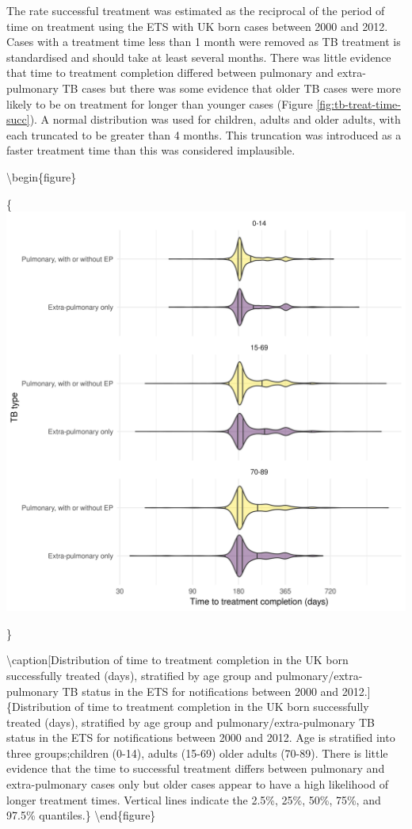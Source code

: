 \documentclass[11pt,twoside]{bristolthesis}
\begin{document}
  The rate successful treatment was estimated as the reciprocal of the period of time on treatment using the ETS with UK born cases between 2000 and 2012. Cases with a treatment time less than 1 month were removed as TB treatment is standardised and should take at least several months. There was little evidence that time to treatment completion differed between pulmonary and extra-pulmonary TB cases but there was some evidence that older TB cases were more likely to be on treatment for longer than younger cases (Figure \ref{fig:tb-treat-time-succ}). A normal distribution was used for children, adults and older adults, with each truncated to be greater than 4 months. This truncation was introduced as a faster treatment time than this was considered implausible.
  
  \textbackslash{}begin\{figure\}
  
  \{\centering \includegraphics[width=0.8\linewidth,]{chapters/model-development/resources/figure/time_cure}
  
  \}
  
  \textbackslash{}caption{[}Distribution of time to treatment completion in the UK born successfully treated (days), stratified by age group and pulmonary/extra-pulmonary TB status in the ETS for notifications between 2000 and 2012.{]}\{Distribution of time to treatment completion in the UK born successfully treated (days), stratified by age group and pulmonary/extra-pulmonary TB status in the ETS for notifications between 2000 and 2012. Age is stratified into three groups;children (0-14), adults (15-69) older adults (70-89). There is little evidence that the time to successful treatment differs between pulmonary and extra-pulmonary cases only but older cases appear to have a high likelihood of longer treatment times. Vertical lines indicate the 2.5\%, 25\%, 50\%, 75\%, and 97.5\% quantiles.\}\label{fig:tb-treat-time-succ}
  \textbackslash{}end\{figure\}
  
\end{document}

